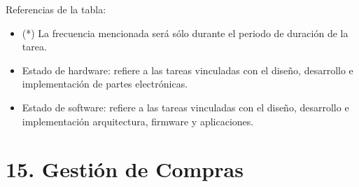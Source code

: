 \documentclass[11pt]{charter}
\begin{document}
\pagebreak

{\footnotesize
Referencias de la tabla:
\begin{itemize}
	\item (*) La frecuencia mencionada será sólo durante el periodo de duración de la tarea.
	\item Estado de hardware: refiere a las tareas vinculadas con el diseño, desarrollo e implementación de partes electrónicas.
	\item Estado de software: refiere a las tareas vinculadas con el diseño, desarrollo e implementación arquitectura, firmware y aplicaciones.
\end{itemize}
} %

\pagebreak
\section{15. Gestión de Compras}
\label{sec:compras}
\end{document}
